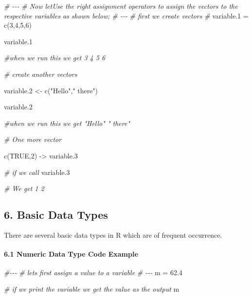 \documentclass[
]{article}
\newenvironment{Shaded}{\begin{snugshade}}{\end{snugshade}}
\newcommand{\CommentTok}[1]{\textcolor[rgb]{0.56,0.35,0.01}{\textit{#1}}}
\newcommand{\ConstantTok}[1]{\textcolor[rgb]{0.00,0.00,0.00}{#1}}
\newcommand{\DecValTok}[1]{\textcolor[rgb]{0.00,0.00,0.81}{#1}}
\newcommand{\FloatTok}[1]{\textcolor[rgb]{0.00,0.00,0.81}{#1}}
\newcommand{\FunctionTok}[1]{\textcolor[rgb]{0.00,0.00,0.00}{#1}}
\newcommand{\NormalTok}[1]{#1}
\newcommand{\OtherTok}[1]{\textcolor[rgb]{0.56,0.35,0.01}{#1}}
\newcommand{\StringTok}[1]{\textcolor[rgb]{0.31,0.60,0.02}{#1}}
\begin{document}
\begin{Shaded}
\begin{Highlighting}[]

\CommentTok{\# {-}{-}{-}}
\CommentTok{\# Now letUse the right assignment operators to assign the vectors to the respective variables as shown below;}
\CommentTok{\# {-}{-}{-}}
\CommentTok{\# first we create vectors}
\CommentTok{\# }
\NormalTok{variable}\FloatTok{.1} \OtherTok{=} \FunctionTok{c}\NormalTok{(}\DecValTok{3}\NormalTok{,}\DecValTok{4}\NormalTok{,}\DecValTok{5}\NormalTok{,}\DecValTok{6}\NormalTok{)  }

\NormalTok{variable}\FloatTok{.1}

\CommentTok{\#when we run this we get 3 4 5 6}


\CommentTok{\# create another vectors}

\NormalTok{variable}\FloatTok{.2} \OtherTok{\textless{}{-}} \FunctionTok{c}\NormalTok{(}\StringTok{"Hello"}\NormalTok{,}\StringTok{" there"}\NormalTok{)  }

\NormalTok{variable}\FloatTok{.2}

\CommentTok{\#when we run this we get "Hello"  " there"}

\CommentTok{\# One more vector}

\FunctionTok{c}\NormalTok{(}\ConstantTok{TRUE}\NormalTok{,}\DecValTok{2}\NormalTok{) }\OtherTok{{-}\textgreater{}}\NormalTok{ variable}\FloatTok{.3} 

\CommentTok{\# if we call }
\NormalTok{variable}\FloatTok{.3}

\CommentTok{\# We get  1 2}
\end{Highlighting}
\end{Shaded}

\hypertarget{basic-data-types}{%
\subsection{6. Basic Data Types}\label{basic-data-types}}

There are several basic data types in R which are of frequent
occurrence.

\hypertarget{numeric-data-type-code-example}{%
\paragraph{6.1 Numeric Data Type Code
Example}\label{numeric-data-type-code-example}}

\begin{Shaded}
\begin{Highlighting}[]

\CommentTok{\#{-}{-}{-}}
\CommentTok{\# lets first assign a value to a variable}
\CommentTok{\# {-}{-}{-}}
\NormalTok{m }\OtherTok{=} \FloatTok{62.4}

\CommentTok{\# if we print the variable we get the value as the output}
\NormalTok{m}
\end{Highlighting}
\end{Shaded}
\end{document}
